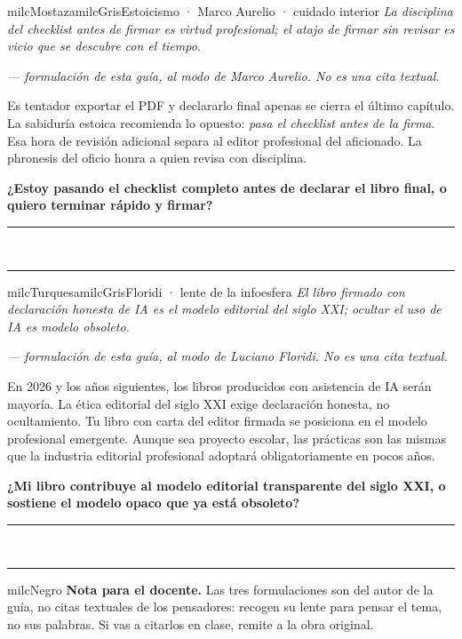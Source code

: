 \documentclass[11pt,letterpaper]{article}
\newcommand{\linead}[1]{\noindent\color{milcLinea}\rule{#1}{0.5pt}\color{milcNegro}}
\begin{document}
\begin{softbox}{milcMostaza}{milcGris}{Estoicismo · Marco Aurelio · cuidado interior}
\textit{La disciplina del checklist antes de firmar es virtud profesional; el atajo de firmar sin revisar es vicio que se descubre con el tiempo.}

{\footnotesize\itshape\color{milcNegro!70}--- formulación de esta guía, al modo de Marco Aurelio. No es una cita textual.}

Es tentador exportar el PDF y declararlo final apenas se cierra el último capítulo. La sabiduría estoica recomienda lo opuesto: \emph{pasa el checklist antes de la firma}. Esa hora de revisión adicional separa al editor profesional del aficionado. La phronesis del oficio honra a quien revisa con disciplina.

\textbf{¿Estoy pasando el checklist completo antes de declarar el libro final, o quiero terminar rápido y firmar?}
\end{softbox}
\linead{\linewidth}\\[1mm]
\linead{\linewidth}

\begin{softbox}{milcTurquesa}{milcGris}{Floridi · lente de la infoesfera}
\textit{El libro firmado con declaración honesta de IA es el modelo editorial del siglo XXI; ocultar el uso de IA es modelo obsoleto.}

{\footnotesize\itshape\color{milcNegro!70}--- formulación de esta guía, al modo de Luciano Floridi. No es una cita textual.}

En 2026 y los años siguientes, los libros producidos con asistencia de IA serán mayoría. La ética editorial del siglo XXI exige declaración honesta, no ocultamiento. Tu libro con carta del editor firmada se posiciona en el modelo profesional emergente. Aunque sea proyecto escolar, las prácticas son las mismas que la industria editorial profesional adoptará obligatoriamente en pocos años.

\textbf{¿Mi libro contribuye al modelo editorial transparente del siglo XXI, o sostiene el modelo opaco que ya está obsoleto?}
\end{softbox}
\linead{\linewidth}\\[1mm]
\linead{\linewidth}

\begin{infoband}{milcNegro}
\textbf{Nota para el docente.} Las tres formulaciones son del autor de la guía, no citas textuales de los pensadores: recogen su lente para pensar el tema, no sus palabras. Si vas a citarlos en clase, remite a la obra original.
\end{infoband}
\end{document}
